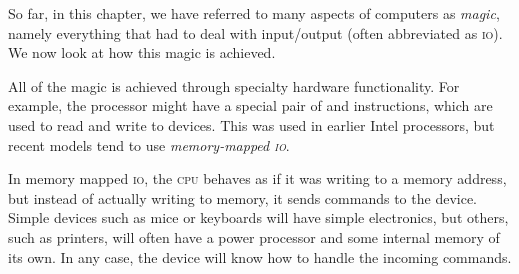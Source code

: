 So far, in this chapter, we have referred to many aspects of computers as
\textit{magic}, namely everything that had to deal with input/output (often
abbreviated as \textsc{io}). We now look at how this magic is achieved.

All of the magic is achieved through specialty hardware functionality. For
example, the processor might have a special pair of  and
 instructions, which are used to read and write to devices.
This was used in earlier Intel processors, but recent models tend to use
\emph{memory-mapped \textsc{io}}.

In memory mapped \textsc{io}, the \textsc{cpu} behaves as if it was writing to
a memory address, but instead of actually writing to memory, it sends commands
to the device. Simple devices such as mice or keyboards will have simple
electronics, but others, such as printers, will often have a power processor
and some internal memory of its own. In any case, the device will know how to
handle the incoming commands.

